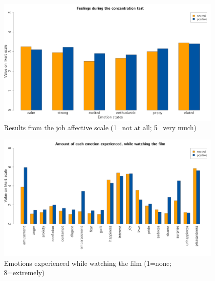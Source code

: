\documentclass[	
	12pt, %
	a4paper, %
  abstracton
]{scrartcl}\usepackage[]{graphicx}\usepackage[]{color}
\newenvironment{knitrout}{}{} %
\begin{document}
\begin{knitrout}\footnotesize
{}\color{fgcolor}\begin{figure}[]


{\centering \includegraphics[width=1\linewidth]{figure/beamer-jobaffect} 

}

\caption[Results from the job affective scale (1=not at all]{Results from the job affective scale (1=not at all; 5=very much)\label{fig:jobaffect}}
\end{figure}


\end{knitrout}


\begin{knitrout}\footnotesize
{}\color{fgcolor}\begin{figure}[]


{\centering \includegraphics[width=1\linewidth]{figure/beamer-emotions} 

}

\caption[Emotions experienced while watching the film (1=none]{Emotions experienced while watching the film (1=none; 8=extremely)\label{fig:emotions}}
\end{figure}


\end{knitrout}
\end{document}
